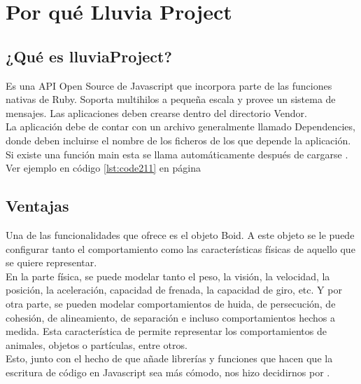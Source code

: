 \section{Por qué Lluvia Project}
\label{section:por_que}

\subsection{¿Qué es lluviaProject?}
\label{subsection:que_es}

Es una API Open Source de Javascript que incorpora parte de las funciones nativas de Ruby. Soporta multihilos a pequeña escala y provee un 
sistema de mensajes. Las aplicaciones deben crearse dentro del directorio Vendor. \\

La aplicación debe de contar con un archivo generalmente llamado Dependencies, donde deben incluirse el nombre de los ficheros de los que 
depende la aplicación. Si existe una función main esta se llama automáticamente después de cargarse \lluvia.\\

Ver ejemplo en código \ref{lst:code211} en página \pageref{lst:code211}


\subsection{Ventajas}
\label{subsection:ventajas}


Una de las funcionalidades que ofrece \lluvia{} es el objeto Boid. A este objeto se le puede configurar tanto el comportamiento como las 
características físicas de aquello que se quiere representar.\\

En la parte física, se puede modelar tanto el peso, la visión, la velocidad, la posición, la aceleración, capacidad de frenada, la capacidad 
de giro, etc. Y por otra parte, se pueden modelar comportamientos de huida, de persecución, de cohesión, de alineamiento, de separación e 
incluso comportamientos hechos a medida. Esta característica de \lluvia{} permite representar los comportamientos de animales, objetos 
o partículas, entre otros.\\

Esto, junto con el hecho de que añade librerías y funciones que hacen que la escritura de código en Javascript sea más cómodo, nos hizo 
decidirnos por \lluvia{}.\\
